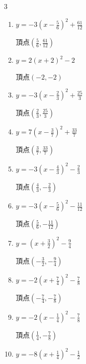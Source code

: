 \begin{multicols}{3}
\begin{enumerate}
        $\displaystyle 頂点\left( -\frac{5}{18} , \frac{241}{36} \right)$

\columnbreak %

\resetques

  \item $\displaystyle y=-3\left( x-\frac{5}{6}\right)^{2}+\frac{61}{12}$

        $\displaystyle 頂点\left( \frac{5}{6} , \frac{61}{12} \right)$

  \item $\displaystyle y=2\left( x+2\right)^{2}-2$

        $\displaystyle 頂点\left( -2 , -2 \right)$

  \item $\displaystyle y=-3\left( x-\frac{2}{3}\right)^{2}+\frac{25}{3}$

        $\displaystyle 頂点\left( \frac{2}{3} , \frac{25}{3} \right)$

  \item $\displaystyle y=7\left( x-\frac{3}{7}\right)^{2}+\frac{33}{7}$

        $\displaystyle 頂点\left( \frac{3}{7} , \frac{33}{7} \right)$

  \item $\displaystyle y=-3\left( x-\frac{4}{3}\right)^{2}-\frac{2}{3}$

        $\displaystyle 頂点\left( \frac{4}{3} , -\frac{2}{3} \right)$

  \item $\displaystyle y=-3\left( x-\frac{5}{6}\right)^{2}-\frac{11}{12}$

        $\displaystyle 頂点\left( \frac{5}{6} , -\frac{11}{12} \right)$

  \item $\displaystyle y=\left( x+\frac{3}{2}\right)^{2}-\frac{9}{4}$

        $\displaystyle 頂点\left( -\frac{3}{2} , -\frac{9}{4} \right)$

  \item $\displaystyle y=-2\left( x+\frac{7}{4}\right)^{2}-\frac{7}{8}$

        $\displaystyle 頂点\left( -\frac{7}{4} , -\frac{7}{8} \right)$

  \item $\displaystyle y=-2\left( x-\frac{1}{4}\right)^{2}-\frac{7}{8}$

        $\displaystyle 頂点\left( \frac{1}{4} , -\frac{7}{8} \right)$

  \item $\displaystyle y=-8\left( x+\frac{1}{4}\right)^{2}-\frac{1}{2}$


\end{enumerate}
\end{multicols}
